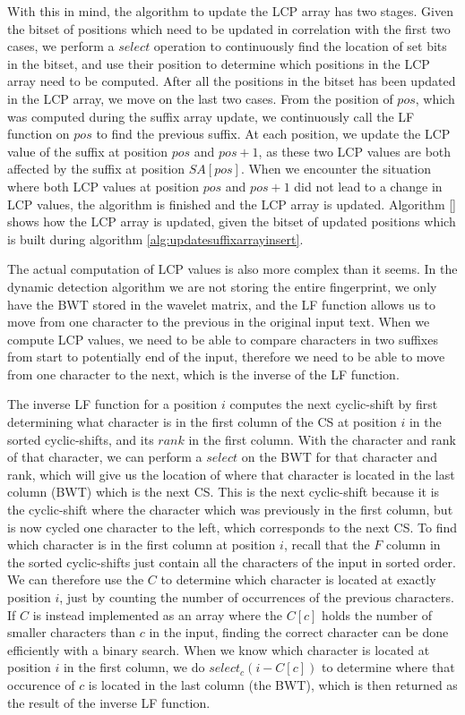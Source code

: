 With this in mind, the algorithm to update the LCP array has two stages. Given the bitset
of positions which need to be updated in correlation with the first two cases, we perform
a $select$ operation to continuously find the location of set bits in the bitset, and use
their position to determine which positions in the LCP array need to be computed. After
all the positions in the bitset has been updated in the LCP array, we move on the last two
cases. From the position of $pos$, which was computed during the suffix array update, we
continuously call the LF function on $pos$ to find the previous suffix. At each position,
we update the LCP value of the suffix at position $pos$ and $pos + 1$, as these two LCP
values are both affected by the suffix at position $SA[pos]$. When we encounter the
situation where both LCP values at position $pos$ and $pos + 1$ did not lead to a change
in LCP values, the algorithm is finished and the LCP array is updated. Algorithm \ref{}
shows how the LCP array is updated, given the bitset of updated positions which is built
during algorithm \ref{alg:updatesuffixarrayinsert}.

The actual computation of LCP values is also more complex than it seems. In the dynamic
detection algorithm we are not storing the entire fingerprint, we only have the BWT stored
in the wavelet matrix, and the LF function allows us to move from one character to the
previous in the original input text. When we compute LCP values, we need to be able to
compare characters in two suffixes from start to potentially end of the input, therefore
we need to be able to move from one character to the next, which is the inverse of the LF
function. 

The inverse LF function for a position $i$ computes the next cyclic-shift by first
determining what character is in the first column of the CS at position $i$ in the sorted
cyclic-shifts, and its $rank$ in the first column. With the character and rank of that
character, we can perform a $select$ on the BWT for that character and rank, which will
give us the location of where that character is located in the last column (BWT) which is
the next CS. This is the next cyclic-shift because it is the cyclic-shift where the
character which was previously in the first column, but is now cycled one character to the
left, which corresponds to the next CS. To find which character is in the first column at
position $i$, recall that the $F$ column in the sorted cyclic-shifts just contain all the
characters of the input in sorted order. We can therefore use the $C$ to determine which
character is located at exactly position $i$, just by counting the number of occurrences
of the previous characters. If $C$ is instead implemented as an array where the $C[c]$
holds the number of smaller characters than $c$ in the input, finding the correct
character can be done efficiently with a binary search. When we know which character is
located at position $i$ in the first column, we do $select_c(i - C[c])$ to determine where
that occurence of $c$ is located in the last column (the BWT), which is then returned as
the result of the inverse LF function.

